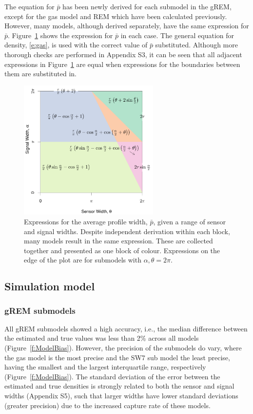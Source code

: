 The equation for $\bar{p}$ has been newly derived for each submodel in the gREM, except for the gas model and REM which have been calculated previously.
However, many models, although derived separately, have the same expression for $\bar{p}$.
Figure~\ref{f:equalModelResults} shows the expression for $\bar{p}$ in each case.
The general equation for density, \ref{e:gas}, is used with the correct value of $\bar{p}$ substituted.
Although more thorough checks are performed in Appendix S3, it can be seen that all adjacent expressions in Figure~\ref{f:equalModelResults} are equal when expressions for the boundaries between them are substituted in.




\begin{figure}
	\centering
	\includegraphics[width=7cm]{imgs/lucas_et_al_figure4.pdf}
	\caption[Expressions for the average profile width]{
Expressions for the average profile width, $\bar{p}$, given a range of sensor and signal widths.
Despite independent derivation within each block, many models result in the same expression.
These are collected together and presented as one block of colour.
Expressions on the edge of the plot are for submodels with $\alpha, \theta = 2\pi$. }
	\label{f:equalModelResults}
\end{figure}



\subsection{Simulation model}

\subsubsection{gREM submodels}
All gREM submodels showed a high accuracy, i.e., the median difference between the estimated and true values was less than 2\% across all models (Figure~\ref{f:ModelBias}).
However, the precision of the submodels do vary, where the gas model is the most precise and the SW7 sub model the least precise, having the smallest and the largest interquartile range, respectively (Figure~\ref{f:ModelBias}).
The standard deviation of the error between the estimated and true densities is strongly related to both the sensor and signal widths (Appendix S5), such that larger widths have lower standard deviations (greater precision) due to the increased capture rate of these models.



